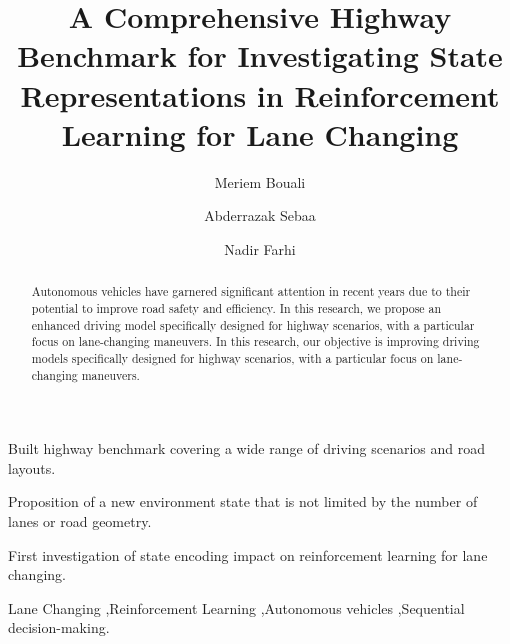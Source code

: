 \documentclass[preprint,12pt,authoryear]{elsarticle}
\begin{document}
\sloppy

\begin{frontmatter}


\title{A Comprehensive Highway Benchmark for Investigating State Representations in Reinforcement Learning for Lane Changing} %


\author[label1]{Meriem Bouali}

\author[label1]{Abderrazak Sebaa}

\author[label2]{Nadir Farhi}







\begin{abstract}
Autonomous vehicles have garnered significant attention in recent years due to their potential to improve road safety and efficiency. In this research, we propose an enhanced driving model specifically designed for highway scenarios, with a particular focus on lane-changing maneuvers. In this research, our objective is improving driving models specifically designed for highway scenarios, with a particular focus on lane-changing maneuvers.

\end{abstract}


\begin{highlights}
\item Built highway benchmark covering a wide range of driving scenarios and road layouts.
\item Proposition of a new environment state that is not limited by the number of lanes or road geometry.
\item First investigation of state encoding impact on reinforcement learning for lane changing.
\end{highlights}

\begin{keyword}
Lane Changing \sep Reinforcement Learning \sep Autonomous vehicles \sep  Sequential decision-making.
\end{keyword}

\end{frontmatter}
\end{document}
